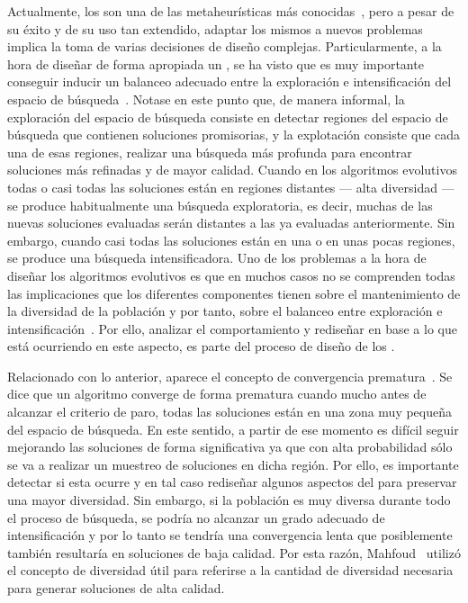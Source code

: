 Actualmente, los \EAS{} son una de las metaheurísticas más conocidas~\cite{glover2005handbook}, pero a pesar de su éxito y de su uso tan extendido, adaptar los mismos
a nuevos problemas implica la toma de varias decisiones de diseño complejas.
%
Particularmente, a la hora de diseñar de forma apropiada un \EA{}, se ha visto que es muy importante conseguir
inducir un balanceo adecuado entre la exploración e intensificación del espacio de búsqueda~\cite{herrera1996adaptation}.
%
Notase en este punto que, de manera informal, la exploración del espacio de búsqueda consiste en detectar regiones del espacio de búsqueda que contienen soluciones
promisorias, y la explotación consiste que cada una de esas regiones, realizar una búsqueda más profunda para encontrar soluciones más refinadas y de mayor calidad.
%
Cuando en los algoritmos evolutivos todas o casi todas las soluciones están en regiones distantes --- alta diversidad --- se produce habitualmente una búsqueda exploratoria, 
es decir, muchas de las nuevas soluciones evaluadas serán distantes a las ya evaluadas anteriormente.
%
Sin embargo, cuando casi todas las soluciones están en una o en unas pocas regiones, se produce una búsqueda intensificadora.
%
Uno de los problemas a la hora de diseñar los algoritmos evolutivos es que en muchos casos no se comprenden todas las implicaciones que los diferentes componentes
tienen sobre el mantenimiento de la diversidad de la población y por tanto, sobre el balanceo entre exploración e intensificación~\cite{Crepinsek:13}.
%
Por ello, analizar el comportamiento y rediseñar en base a lo que está ocurriendo en este aspecto, es parte del proceso de diseño de los \EAS{}.

Relacionado con lo anterior, aparece el concepto de convergencia prematura~\cite{Crepinsek:13}.
%
Se dice que un algoritmo converge de forma prematura cuando mucho antes de alcanzar el criterio de paro, todas las soluciones están en una zona muy pequeña del espacio de búsqueda.
%
En este sentido, a partir de ese momento es difícil seguir mejorando las soluciones de forma significativa ya que con alta probabilidad sólo se va a realizar un muestreo de soluciones en dicha
región.
%
Por ello, es importante detectar si esta ocurre y en tal caso rediseñar algunos aspectos del \EA{}
para preservar una mayor diversidad.
%
Sin embargo, si la población es muy diversa durante todo el proceso de búsqueda, se podría no alcanzar un grado adecuado de intensificación y por lo tanto 
se tendría una convergencia lenta que posiblemente también resultaría en soluciones de baja calidad.
%
Por esta razón, Mahfoud~\cite{dasgupta2013evolutionary} utilizó el concepto de diversidad útil para referirse a la cantidad de diversidad necesaria para generar 
soluciones de alta calidad.

